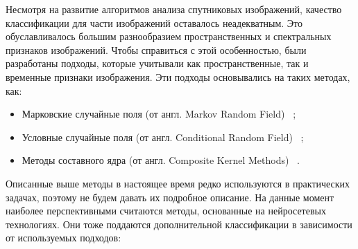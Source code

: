 \documentclass[14pt, russian]{scrartcl}
\begin{document}
Несмотря на развитие алгоритмов анализа спутниковых изображений, качество классификации для части изображений оставалось неадекватным. Это обуславливалось большим разнообразием пространственных и спектральных признаков изображений. Чтобы справиться с этой особенностью, были разработаны подходы, которые учитывали как пространственные, так и временные признаки изображения. Эти подходы основывались на таких методах, как:

\begin{itemize}
    \item Марковские случайные поля (от англ. Markov Random Field) ~\cite{22};
    \item Условные случайные поля (от англ. Conditional Random Field) ~\cite{23};
    \item Методы составного ядра (от англ. Composite Kernel Methods) ~\cite{24}.
\end{itemize}

Описанные выше методы в настоящее время редко используются в практических задачах, поэтому не будем давать их подробное описание. На данные момент наиболее перспективными считаются методы, основанные на нейросетевых технологиях. Они тоже поддаются дополнительной классификации в зависимости от используемых подходов:
\end{document}
